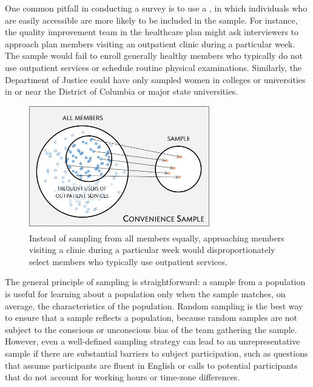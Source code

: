 \begin{doublespace}
One common pitfall in conducting a survey is to use a , in which individuals who are easily accessible are more likely to be included in the sample. For instance, the quality improvement team in the healthcare plan might ask interviewers to approach plan members visiting an outpatient clinic during a particular week.  The sample would fail to enroll generally healthy members who typically do not use outpatient services or schedule routine physical examinations. Similarly, the Department of Justice could have only sampled women in colleges or universities in or near the District of Columbia or major state universities.  

\begin{figure}
	\centering
	\includegraphics[width=0.70\textwidth]{ch_intro_to_data_oi_biostat/figures/sampleHealthPlan/sampleConvenienceHealthPlan.png}
	\caption{Instead of sampling from all members equally, approaching members visiting a clinic during a particular week would disproportionately select members who typically use outpatient services.}
	\label{sampleConvenienceHealthPlan}
\end{figure}


The general principle of sampling is straightforward: a sample from a population is useful for learning about a population only when the sample matches, on average, the characteristics of the population. Random sampling is the best way to ensure that a sample reflects a population, because random samples are not subject to the conscious or unconscious bias of the team gathering the sample.  However, even a well-defined sampling strategy can lead to an unrepresentative sample if there are substantial barriers to subject participation, such as questions that assume participants are fluent in English or calls to potential participants that do not account for working hours or time-zone differences. 


\end{doublespace}
